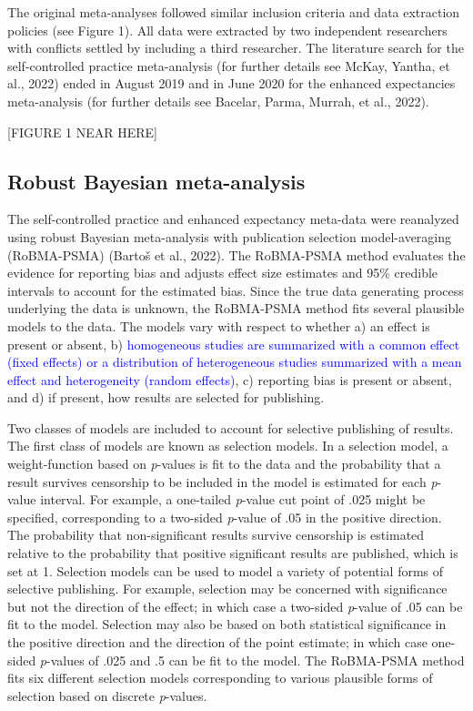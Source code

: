 \documentclass[
  man, donotrepeattitle,mask,floatsintext]{apa7}
\begin{document}
The original meta-analyses followed similar inclusion criteria and data extraction policies (see Figure 1). All data were extracted by two independent researchers with conflicts settled by including a third researcher. The literature search for the self-controlled practice meta-analysis (for further details see McKay, Yantha, et al., 2022) ended in August 2019 and in June 2020 for the enhanced expectancies meta-analysis (for further details see Bacelar, Parma, Murrah, et al., 2022).

\begin{center}
[FIGURE 1 NEAR HERE]
\end{center}

\hypertarget{robust-bayesian-meta-analysis}{%
\subsection{Robust Bayesian meta-analysis}\label{robust-bayesian-meta-analysis}}

The self-controlled practice and enhanced expectancy meta-data were reanalyzed using robust Bayesian meta-analysis with publication selection model-averaging (RoBMA-PSMA) (Bartoš et al., 2022). The RoBMA-PSMA method evaluates the evidence for reporting bias and adjusts effect size estimates and 95\% credible intervals to account for the estimated bias. Since the true data generating process underlying the data is unknown, the RoBMA-PSMA method fits several plausible models to the data. The models vary with respect to whether a) an effect is present or absent, b) \textcolor{blue}{homogeneous studies are summarized with a common effect (fixed effects) or a distribution of heterogeneous studies summarized with a mean effect and heterogeneity (random effects)}, c) reporting bias is present or absent, and d) if present, how results are selected for publishing.

Two classes of models are included to account for selective publishing of results. The first class of models are known as selection models. In a selection model, a weight-function based on \emph{p}-values is fit to the data and the probability that a result survives censorship to be included in the model is estimated for each \emph{p}-value interval. For example, a one-tailed \emph{p}-value cut point of .025 might be specified, corresponding to a two-sided \emph{p}-value of .05 in the positive direction. The probability that non-significant results survive censorship is estimated relative to the probability that positive significant results are published, which is set at 1. Selection models can be used to model a variety of potential forms of selective publishing. For example, selection may be concerned with significance but not the direction of the effect; in which case a two-sided \emph{p}-value of .05 can be fit to the model. Selection may also be based on both statistical significance in the positive direction and the direction of the point estimate; in which case one-sided \emph{p}-values of .025 and .5 can be fit to the model. The RoBMA-PSMA method fits six different selection models corresponding to various plausible forms of selection based on discrete \emph{p}-values.
\end{document}
